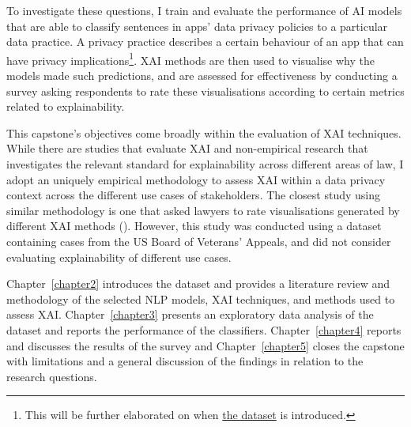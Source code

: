 To investigate these questions, I train and evaluate the performance of AI models that are able to classify sentences in apps' data privacy policies to a particular data practice. A privacy practice describes a certain behaviour of an app that can have privacy implications\footnote{This will be further elaborated on when \hyperref[app350_corpus]{the dataset} is introduced.}. XAI methods are then used to visualise why the models made such predictions, and are assessed for effectiveness by conducting a survey asking respondents to rate these visualisations according to certain metrics related to explainability.

This capstone's objectives come broadly within the evaluation of XAI techniques. While there are studies that evaluate XAI and non-empirical research that investigates the relevant standard for explainability across different areas of law, I adopt an uniquely empirical methodology to assess XAI within a data privacy context across the different use cases of stakeholders. The closest study using similar methodology is one that asked lawyers to rate visualisations generated by different XAI methods (\cite{gorski2021}). However, this study was conducted using a dataset containing cases from the US Board of Veterans' Appeals, and did not consider evaluating explainability of different use cases.

Chapter~\ref{chapter2} introduces the dataset and provides a literature review and methodology of the selected NLP models, XAI techniques, and methods used to assess XAI. Chapter~\ref{chapter3} presents an exploratory data analysis of the dataset and reports the performance of the classifiers. Chapter~\ref{chapter4} reports and discusses the results of the survey and Chapter~\ref{chapter5} closes the capstone with limitations and a general discussion of the findings in relation to the research questions.